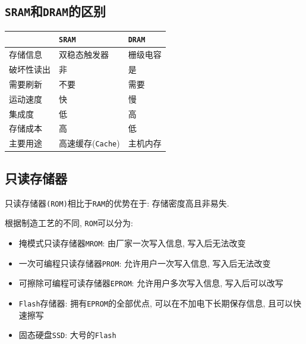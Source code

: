 \subsection{\texttt{SRAM}和\texttt{DRAM}的区别}
\begin{table}[H]
\begin{tabularx}{\textwidth}{|Z|Z|Z|}
\hline
& \verb|SRAM| & \verb|DRAM| \\ \hline
存储信息 & 双稳态触发器 & 栅级电容 \\ \hline
破坏性读出 & 非 & 是 \\ \hline
需要刷新 & 不要 & 需要 \\ \hline
运动速度 & 快 & 慢 \\ \hline
集成度 & 低 & 高 \\ \hline
存储成本 & 高 & 低 \\ \hline
主要用途 & 高速缓存(\verb|Cache|) & 主机内存 \\
\hline
\end{tabularx}
\end{table}
\subsection{只读存储器}
只读存储器\verb|(ROM)|相比于\verb|RAM|的优势在于: 存储密度高且非易失. \vspace{.5em}\par
根据制造工艺的不同, \verb|ROM|可以分为:
\begin{itemize}
\item 掩模式只读存储器\verb|MROM|: 由厂家一次写入信息, 写入后无法改变
\item 一次可编程只读存储器\verb|PROM|: 允许用户一次写入信息, 写入后无法改变
\item 可擦除可编程可读存储器\verb|EPROM|: 允许用户多次写入信息, 写入后可以改写
\item \verb|Flash|存储器: 拥有\verb|EPROM|的全部优点, 可以在不加电下长期保存信息, 且可以快速擦写
\item 固态硬盘\verb|SSD|: 大号的\verb|Flash|
\end{itemize}
